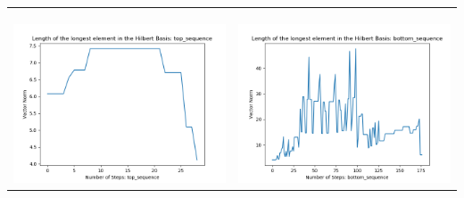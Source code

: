 \documentclass[10pt]{article}
\begin{document}
\begin{tabular}{c|c}
\begin{minipage}{.45\textwidth}
\end{minipage} \\ \\
\hline \\\begin{minipage}{.45\textwidth}
\includegraphics[width=\textwidth]{"DATA/5d/5 generators 2 bound C/top_sequence LENGTH"}
\end{minipage} &
\begin{minipage}{.45\textwidth}
\includegraphics[width=\textwidth]{"DATA/5d/5 generators 2 bound C bottomup/bottom_sequence LENGTH"}
\end{minipage}
\end{tabular}
\end{document}

